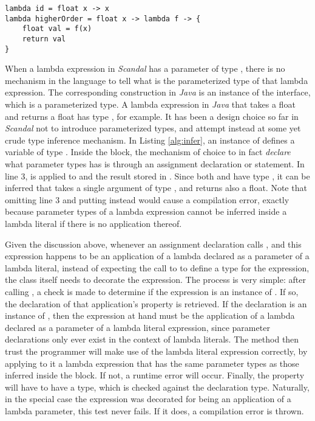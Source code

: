 \begin{lstlisting}[emph={lambda,float,return},emphstyle={\textbf},caption={Type inference in \emph{Scandal}.},label={alg:infer}]
lambda id = float x -> x
lambda higherOrder = float x -> lambda f -> {
	float val = f(x)
	return val
}
\end{lstlisting}

When a lambda expression in \emph{Scandal} has a parameter of type , there is no mechanism in the language to tell what is the parameterized type of that lambda expression. The corresponding construction in \emph{Java} is an instance of the  interface, which is a parameterized type. A lambda expression in \emph{Java} that takes a float and returns a float has type , for example. It has been a design choice so far in \emph{Scandal} not to introduce parameterized types, and attempt instead at some yet crude type inference mechanism. In Listing \ref{alg:infer}, an instance of  defines a variable  of type . Inside the block, the mechanism of choice to in fact \emph{declare} what parameter types  has is through an assignment declaration or statement. In line 3,  is applied to  and the result stored in . Since both  and  have type , it can be inferred that  takes a single argument of type , and returns also a float. Note that omitting line 3 and putting  instead would cause a compilation error, exactly because parameter types of a lambda expression cannot be inferred inside a lambda literal if there is no application thereof.

Given the discussion above, whenever an assignment declaration calls , and this expression happens to be an application of a lambda declared as a parameter of a lambda literal, instead of expecting the call to  to define a type for the expression, the  class itself needs to decorate the expression. The process is very simple: after calling , a check is made to determine if the expression is an instance of . If so, the declaration of that application's  property is retrieved. If the declaration is an instance of , then the expression at hand must be the application of a lambda declared as a parameter of a lambda literal expression, since parameter declarations only ever exist in the context of lambda literals. The  method then trust the programmer will make use of the lambda literal expression correctly, by applying to it a lambda expression that has the same parameter types as those inferred inside the block. If not, a runtime error will occur. Finally, the  property will have to have a type, which is checked against the declaration type. Naturally, in the special case the expression was decorated for being an application of a lambda parameter, this test never fails. If it does, a compilation error is thrown.

